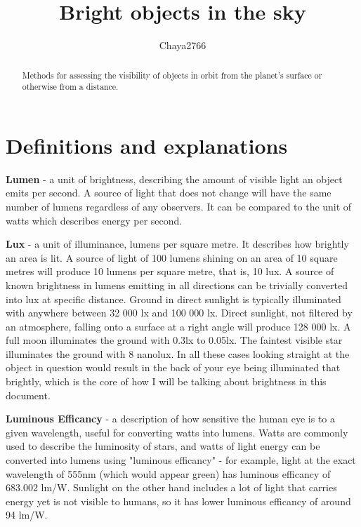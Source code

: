 \documentclass[a4paper]{article}
\title{Bright objects in the sky}
\author{Chaya2766}
\begin{document}
	\sffamily
	\hyphenchar{}
	\sloppy
	
	\maketitle
	
	\textbf{
		\sloppy
		\hyphenchar{}
		}
	
	\vfill
	
	\begin{abstract}
		Methods for assessing the visibility of objects in orbit from the planet's surface or otherwise from a distance.
	\end{abstract}
	
	\vfill
	
	\tableofcontents
	
	\pagebreak
	
	\section{Definitions and explanations}
	
	\textbf{Lumen} - a unit of brightness, describing the amount of visible light an object emits per second.
	A source of light that does not change will have the same number of lumens regardless of any observers.
	It can be compared to the unit of watts which describes energy per second.
	
	\bigskip
	
	\textbf{Lux} - a unit of illuminance, lumens per square metre. It describes how brightly an area is lit. A source of light of 100 lumens shining on an area of 10 square metres will produce 10 lumens per square metre, that is, 10 lux.
	A source of known brightness in lumens emitting in all directions can be trivially converted into lux at specific distance.
	Ground in direct sunlight is typically illuminated with anywhere between 32 000 lx and 100 000 lx.
	Direct sunlight, not filtered by an atmosphere, falling onto a surface at a right angle will produce 128 000 lx.
	A full moon illuminates the ground with 0.3lx to 0.05lx.
	The faintest visible star illuminates the ground with 8 nanolux.
	In all these cases looking straight at the object in question would result in the back of your eye being illuminated that brightly, which is the core of how I will be talking about brightness in this document.
	
	\bigskip
	
	\textbf{Luminous Efficancy} - a description of how sensitive the human eye is to a given wavelength, useful for converting watts into lumens. Watts are commonly used to describe the luminosity of stars, and watts of light energy can be converted into lumens using "luminous efficancy" - for example, light at the exact wavelength of 555nm (which would appear green) has luminous efficancy of 683.002 lm/W. Sunlight on the other hand includes a lot of light that carries energy yet is not visible to humans, so it has lower luminous efficancy of around 94 lm/W.
	
\end{document}
